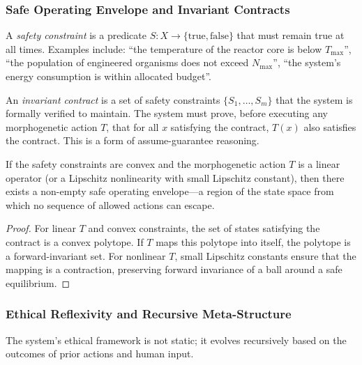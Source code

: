 \subsubsection{Safe Operating Envelope and Invariant Contracts}
\begin{definition}
A \emph{safety constraint} is a predicate $S: X \to \{\text{true}, \text{false}\}$ that must remain true at all times. Examples include: ``the temperature of the reactor core is below $T_{\text{max}}$'', ``the population of engineered organisms does not exceed $N_{\text{max}}$'', ``the system's energy consumption is within allocated budget''.
\end{definition}

\begin{definition}
An \emph{invariant contract} is a set of safety constraints $\{S_1, \dots, S_m\}$ that the system is formally verified to maintain. The system must prove, before executing any morphogenetic action $T$, that for all $x$ satisfying the contract, $T(x)$ also satisfies the contract. This is a form of assume-guarantee reasoning.
\end{definition}

\begin{theorem}
\label{thm:safe_envelope}
If the safety constraints are convex and the morphogenetic action $T$ is a linear operator (or a Lipschitz nonlinearity with small Lipschitz constant), then there exists a non-empty safe operating envelope—a region of the state space from which no sequence of allowed actions can escape.
\end{theorem}
\begin{proof}
For linear $T$ and convex constraints, the set of states satisfying the contract is a convex polytope. If $T$ maps this polytope into itself, the polytope is a forward-invariant set. For nonlinear $T$, small Lipschitz constants ensure that the mapping is a contraction, preserving forward invariance of a ball around a safe equilibrium.
\end{proof}

\subsubsection{Ethical Reflexivity and Recursive Meta-Structure}
The system's ethical framework is not static; it evolves recursively based on the outcomes of prior actions and human input.

